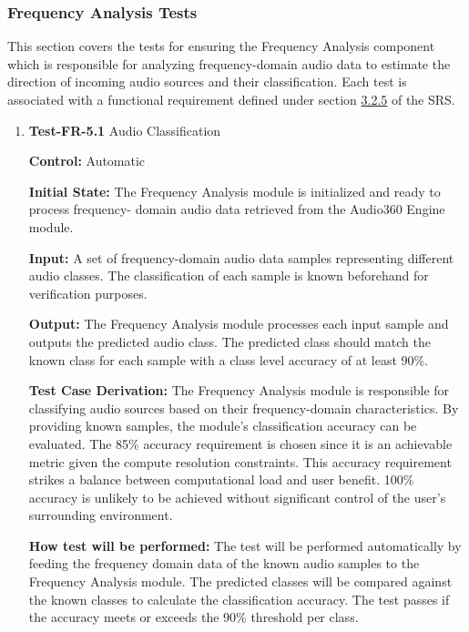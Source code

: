 \documentclass[12pt, titlepage]{article}
\begin{document}
\subsubsection{Frequency Analysis Tests}

This section covers the tests for ensuring the Frequency Analysis component
which is responsible for analyzing frequency-domain audio data to estimate the
direction of incoming audio sources and their classification. Each test is
associated with a functional requirement defined under section
\hyperref[SRS-sec:FR5]{3.2.5} of the SRS.
\begin{enumerate}

\label{sec:freq-analysis-tests}
\item{\textbf{Test-FR-5.1} Audio Classification\\}

\textbf{Control:} Automatic

\textbf{Initial State:}
The Frequency Analysis module is initialized and ready to process frequency-
domain audio data retrieved from the Audio360 Engine module. 

\textbf{Input:}
A set of frequency-domain audio data samples representing different audio
classes. The classification of each sample is known beforehand for verification
purposes.

\textbf{Output:}
The Frequency Analysis module processes each input sample and outputs the
predicted audio class. The predicted class should match the known class for each
sample with a class level accuracy of at least 90\%.

\textbf{Test Case Derivation:}
The Frequency Analysis module is responsible for classifying audio sources based
on their frequency-domain characteristics. By providing known samples, the
module's classification accuracy can be evaluated. The 85\% accuracy requirement
is chosen since it is an achievable metric given the compute resolution 
constraints. This accuracy requirement strikes a balance between computational
load and user benefit. 100\% accuracy is unlikely to be achieved without
significant control of the user's surrounding environment. 

\textbf{How test will be performed:}
The test will be performed automatically by feeding the frequency domain data of
the known audio samples to the Frequency Analysis module. The predicted classes
will be compared against the known classes to calculate the classification
accuracy. The test passes if the accuracy meets or exceeds the 90\% threshold
per class.


\end{enumerate}
\end{document}

